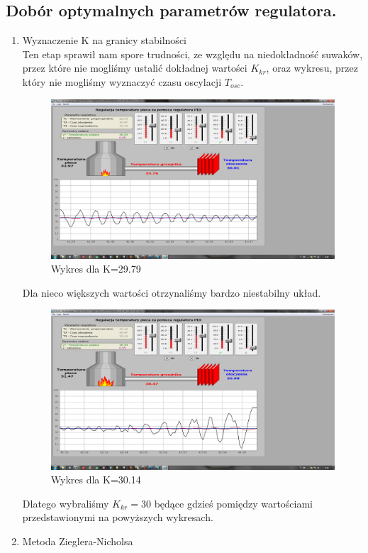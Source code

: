 \documentclass[a4paper,10pt]{article}
\begin{document}
\subsection{Dobór optymalnych parametrów regulatora.}\label{sec:zad2}
\begin{enumerate}
	\item Wyznaczenie K na granicy stabilności\\
		Ten etap sprawił nam spore trudności, ze względu na niedokładność suwaków, przez które nie mogliśmy ustalić dokładnej wartości $K_{kr}$, oraz wykresu, przez który nie mogliśmy wyznaczyć czasu oscylacji $T_{osc}$.
		\begin{figure}[!h]
		    \centering
			\includegraphics[width=120mm]{CW6-T130-(Kkr)-T220-T330.png}
			\caption{Wykres dla K=29.79}
		    \label{fig:Rysunek}
		\end{figure}
		\newline Dla nieco większych wartości otrzynaliśmy bardzo niestabilny układ.
		\begin{figure}[!h]
		    \centering
			\includegraphics[width=120mm]{CW6-T130+(Kkr)-T220-T330.png}
			\caption{Wykres dla K=30.14}
		    \label{fig:Rysunek}
		\end{figure}
		\newline Dlatego wybraliśmy $K_{kr}=30$ będące gdzieś pomiędzy wartościami przedstawionymi na powyższych wykresach.\newpage
	\item Metoda Zieglera-Nicholsa	


\end{enumerate}
\end{document}
